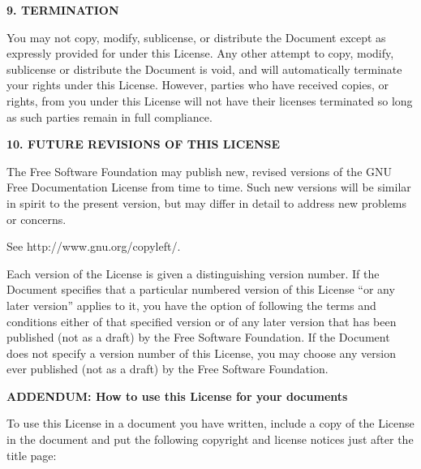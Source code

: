 \begin{center}
{\Large\bf 9. TERMINATION\par}
\end{center}


You may not copy, modify, sublicense, or distribute the Document except
as expressly provided for under this License.  Any other attempt to
copy, modify, sublicense or distribute the Document is void, and will
automatically terminate your rights under this License.  However,
parties who have received copies, or rights, from you under this
License will not have their licenses terminated so long as such
parties remain in full compliance.


\begin{center}
{\Large\bf 10. FUTURE REVISIONS OF THIS LICENSE\par}
\end{center}


The Free Software Foundation may publish new, revised versions
of the GNU Free Documentation License from time to time.  Such new
versions will be similar in spirit to the present version, but may
differ in detail to address new problems or concerns.  

\noindent 
See http://www.gnu.org/copyleft/.

Each version of the License is given a distinguishing version number.
If the Document specifies that a particular numbered version of this
License ``or any later version'' applies to it, you have the option of
following the terms and conditions either of that specified version or
of any later version that has been published (not as a draft) by the
Free Software Foundation.  If the Document does not specify a version
number of this License, you may choose any version ever published (not
as a draft) by the Free Software Foundation.


\begin{center}
{\Large\bf ADDENDUM: How to use this License for your documents\par}
\end{center}

To use this License in a document you have written, include a copy of
the License in the document and put the following copyright and
license notices just after the title page:

